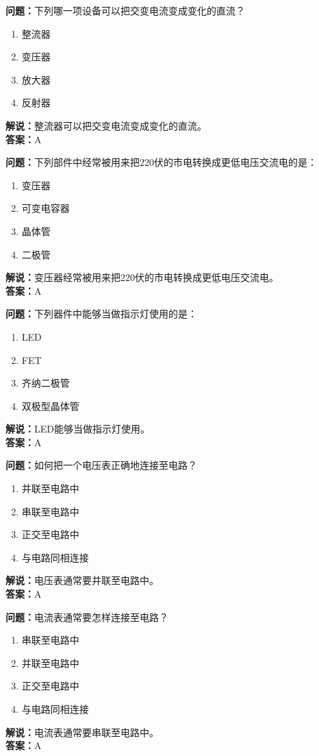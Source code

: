 \documentclass[UTF8]{ctexbook}
\begin{document}
\textbf{问题：}下列哪一项设备可以把交变电流变成变化的直流？
\begin{enumerate}[label=\Alph*), leftmargin=3em]
  \item 整流器
  \item 变压器
  \item 放大器
  \item 反射器
\end{enumerate}
\textbf{解说：}整流器可以把交变电流变成变化的直流。\\
\textbf{答案：}A

\textbf{问题：}下列部件中经常被用来把220伏的市电转换成更低电压交流电的是：
\begin{enumerate}[label=\Alph*), leftmargin=3em]
  \item 变压器
  \item 可变电容器
  \item 晶体管
  \item 二极管
\end{enumerate}
\textbf{解说：}变压器经常被用来把220伏的市电转换成更低电压交流电。\\
\textbf{答案：}A

\textbf{问题：}下列器件中能够当做指示灯使用的是：
\begin{enumerate}[label=\Alph*), leftmargin=3em]
  \item LED
  \item FET
  \item 齐纳二极管
  \item 双极型晶体管
\end{enumerate}
\textbf{解说：}LED能够当做指示灯使用。\\
\textbf{答案：}A

\textbf{问题：}如何把一个电压表正确地连接至电路？
\begin{enumerate}[label=\Alph*), leftmargin=3em]
  \item 并联至电路中
  \item 串联至电路中
  \item 正交至电路中
  \item 与电路同相连接
\end{enumerate}
\textbf{解说：}电压表通常要并联至电路中。\\
\textbf{答案：}A

\textbf{问题：}电流表通常要怎样连接至电路？
\begin{enumerate}[label=\Alph*), leftmargin=3em]
  \item 串联至电路中
  \item 并联至电路中
  \item 正交至电路中
  \item 与电路同相连接
\end{enumerate}
\textbf{解说：}电流表通常要串联至电路中。\\
\textbf{答案：}A
\end{document}
